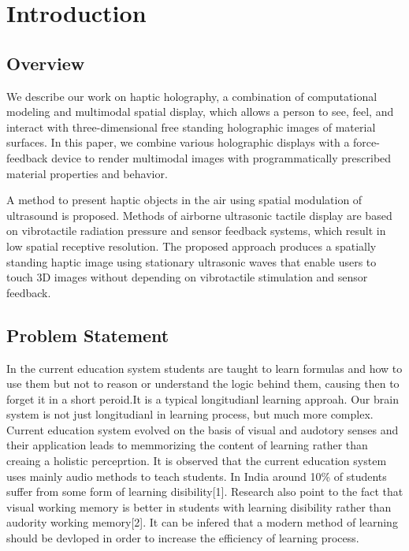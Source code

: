 \documentclass{fisatproject}
\begin{document}
\cleardoublepage
{}
\listoftables
\newpage



\chapter{Introduction}
\setcounter{page}{1}
\renewcommand{\baselinestretch}{1.50}
\section{Overview}
\par We describe our work on haptic holography, a combination of computational modeling and multimodal spatial display, which allows a person to see, feel, and interact with three-dimensional free standing holographic images of material surfaces. In this paper, we combine various holographic displays with a force-feedback device to render multimodal images with programmatically prescribed material properties and behavior.


\par A method to present haptic objects in the air using spatial modulation of ultrasound is proposed. Methods of airborne ultrasonic tactile display are based on vibrotactile radiation pressure and sensor feedback systems, which result in low spatial receptive resolution. The proposed approach produces a spatially standing haptic image using stationary ultrasonic waves that enable users to touch 3D images without depending on vibrotactile stimulation and sensor feedback.


\section{Problem Statement}

\par In the current education system students are taught to learn formulas and how to use them but not to reason or understand the logic behind them, causing then to forget it in a short peroid.It is a typical longitudianl learning approah. Our brain system is not just longitudianl in learning process, but much more complex. Current education system evolved on the basis of visual and audotory senses and their application leads to memmorizing the content of learning rather than creaing a holistic perceprtion.
It is observed that the current education system  uses mainly audio methods to teach students.
In India around 10\% of students suffer from some form of learning disibility[1]. Research also point to the fact that visual working memory is better in students with learning disibility rather than audority working memory[2].
It can be infered that a modern method of learning should be devloped in order to increase the efficiency of learning process.
\end{document}
